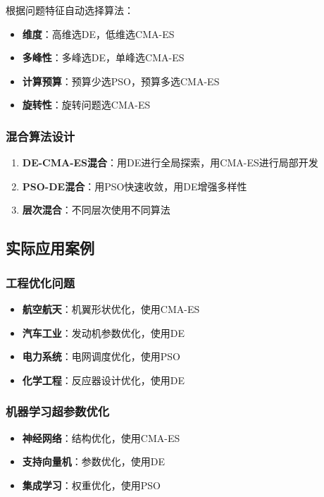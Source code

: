 根据问题特征自动选择算法：
\begin{itemize}
    \item \textbf{维度}：高维选DE，低维选CMA-ES
    \item \textbf{多峰性}：多峰选DE，单峰选CMA-ES
    \item \textbf{计算预算}：预算少选PSO，预算多选CMA-ES
    \item \textbf{旋转性}：旋转问题选CMA-ES
\end{itemize}

\subsubsection{混合算法设计}

\begin{enumerate}
    \item \textbf{DE-CMA-ES混合}：用DE进行全局探索，用CMA-ES进行局部开发
    \item \textbf{PSO-DE混合}：用PSO快速收敛，用DE增强多样性
    \item \textbf{层次混合}：不同层次使用不同算法
\end{enumerate}

\subsection{实际应用案例}

\subsubsection{工程优化问题}

\begin{itemize}
    \item \textbf{航空航天}：机翼形状优化，使用CMA-ES
    \item \textbf{汽车工业}：发动机参数优化，使用DE
    \item \textbf{电力系统}：电网调度优化，使用PSO
    \item \textbf{化学工程}：反应器设计优化，使用DE
\end{itemize}

\subsubsection{机器学习超参数优化}

\begin{itemize}
    \item \textbf{神经网络}：结构优化，使用CMA-ES
    \item \textbf{支持向量机}：参数优化，使用DE
    \item \textbf{集成学习}：权重优化，使用PSO
\end{itemize}

